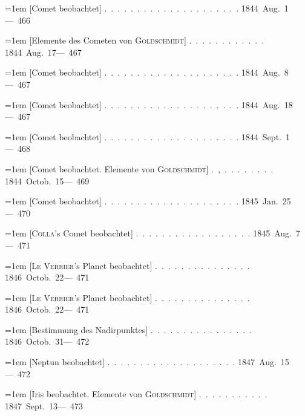 \noindent\hangindent=1em [Comet beobachtet] \mbox{.\ .\ .\ .\ .\ .\ .\ .\ .\ .\ .\ .\ .\ .\ .\ .\ .\ .\ .\ .\ .} \hfill\mbox{1844 Aug. 1}\quad\mbox{--- 466}\par\smallskip
\noindent\hangindent=1em [Elemente des Cometen von \textsc{Goldschmidt}] \mbox{.\ .\ .\ .\ .\ .\ .\ .\ .\ .\ .\ .} \hfill\mbox{1844 Aug. 17}\quad\mbox{--- 467}\par\smallskip
\noindent\hangindent=1em [Comet beobachtet] \mbox{.\ .\ .\ .\ .\ .\ .\ .\ .\ .\ .\ .\ .\ .\ .\ .\ .\ .\ .\ .\ .} \hfill\mbox{1844 Aug. 8}\quad\mbox{--- 467}\par\smallskip
\noindent\hangindent=1em [Comet beobachtet] \mbox{.\ .\ .\ .\ .\ .\ .\ .\ .\ .\ .\ .\ .\ .\ .\ .\ .\ .\ .\ .\ .} \hfill\mbox{1844 Aug. 18}\quad\mbox{--- 467}\par\smallskip
\noindent\hangindent=1em [Comet beobachtet] \mbox{.\ .\ .\ .\ .\ .\ .\ .\ .\ .\ .\ .\ .\ .\ .\ .\ .\ .\ .\ .\ .} \hfill\mbox{1844 Sept. 1}\quad\mbox{--- 468}\par\smallskip
\noindent\hangindent=1em [Comet beobachtet. Elemente von \textsc{Goldschmidt}] \mbox{.\ ,\ .\ .\ .\ .\ .\ .\ .\ .} \hfill\mbox{1844 Octob. 15}\quad\mbox{--- 469}\par\smallskip
\noindent\hangindent=1em [Comet beobachtet] \mbox{.\ .\ .\ .\ .\ .\ .\ .\ .\ .\ .\ .\ .\ .\ .\ .\ .\ .\ .\ .\ .} \hfill\mbox{1845 Jan. 25}\quad\mbox{--- 470}\par\smallskip
\noindent\hangindent=1em [\textsc{Colla}'s Comet beobachtet] \mbox{.\ .\ .\ .\ .\ .\ .\ .\ .\ .\ .\ .\ .\ .\ .\ .\ .\ .} \hfill\mbox{1845 Aug. 7}\quad\mbox{--- 471}\par\smallskip
\noindent\hangindent=1em [\textsc{Le Verrier}'s Planet beobachtet] \mbox{.\ .\ .\ .\ .\ .\ .\ .\ .\ .\ .\ .\ .\ .\ .} \hfill\mbox{1846 Octob. 22}\quad\mbox{--- 471}\par\smallskip
\noindent\hangindent=1em [\textsc{Le Verrier}'s Planet beobachtet] \mbox{.\ .\ .\ .\ .\ .\ .\ .\ .\ .\ .\ .\ .\ .\ .} \hfill\mbox{1846 Octob. 22}\quad\mbox{--- 471}\par\smallskip
\noindent\hangindent=1em [Bestimmung des Nadirpunktes] \mbox{.\ .\ .\ .\ .\ .\ .\ .\ .\ .\ .\ .\ .\ .\ .\ .} \hfill\mbox{1846 Octob. 31}\quad\mbox{--- 472}\par\smallskip
\noindent\hangindent=1em [Neptun beobachtet] \mbox{.\ .\ .\ .\ .\ .\ .\ .\ .\ .\ .\ .\ .\ .\ .\ .\ .\ .\ .\ .} \hfill\mbox{1847 Aug. 15}\quad\mbox{--- 472}\par\smallskip
\noindent\hangindent=1em [Iris beobachtet. Elemente von \textsc{Goldschmidt}] \mbox{.\ .\ .\ .\ .\ .\ .\ .\ .\ .\ .} \hfill\mbox{1847 Sept. 13}\quad\mbox{--- 473}\par\smallskip
